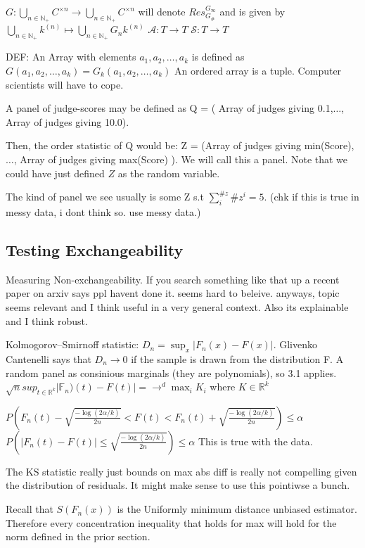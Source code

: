 \documentclass{article}
\begin{document}
$G:\bigcup_{n\in\mathbb{N_+}} C^{\times n}\rightarrow \bigcup_{n\in\mathbb{N_+}} C^{\times n} $ will denote $Res^{G_\infty}_{G_\#}$ and is given by $\bigcup_{n\in \mathbb{N_+}} k^{(n)} \mapsto \bigcup_{n\in \mathbb{N_+}} G_nk^{(n)}$
$\mathcal{A}:T\rightarrow T$
$\mathcal{S}:T\rightarrow T$

DEF: An Array with elements $a_1,a_2,\dots,a_k $ is defined as $G(a_1,a_2,\dots,a_k) = G_k(a_1,a_2,\dots,a_k) $
An ordered array is a tuple. Computer scientists will have to cope.

A panel of judge-scores may be defined as Q = ( Array of judges giving 0.1,$ \dots$, Array of judges giving 10.0).

Then, the order statistic of Q would be: Z = (Array of judges giving min(Score),$\dots$, Array of judges giving max(Score) ). We will call this a panel. Note that we could have just defined $Z$ as the random variable.

The kind of panel we see usually is some Z s.t $\sum_i^{\#z} \#z^i = 5 $.
(chk if this is true in messy data, i dont think so. use messy data.)

\subsection{Testing Exchangeability}
Measuring Non-exchangeability. If you search something like that up a recent paper on arxiv says ppl havent done it. seems hard to beleive. anyways, topic seems relevant and I think useful in a very general context. Also its explainable and I think robust.

\cite{Naaman21}
Kolmogorov–Smirnoff statistic: $D_n = \sup_x |F_n(x) - F(x)| $.
Glivenko Cantenelli says that $D_n \rightarrow 0$ if the sample is drawn from the distribution F.
A random panel as consinious marginals (they are polynomials), so 3.1 applies.
$\sqrt{n} sup_{t\in \mathbb{R}^k}| \mathbb{F}_n)(t) - F(t) | = \rightarrow^d \max_i K_i$ where $K\in \mathbb{R}^k$

$P( F_n(t) - \sqrt{\frac{-\log(2\alpha/ k)}{2n}} < F(t) < F_n(t) + \sqrt{\frac{-\log(2\alpha/k)}{2n}} ) \leq \alpha $ 
$P( |F_n(t) - F(t)|\leq \sqrt{\frac{-\log(2\alpha/ k)}{2n}} ) \leq \alpha $ 
This is true with the data.

The KS statistic really just bounds on max abs diff is really not compelling given the distribution of residuals. It might make sense to use this pointiwse a bunch.

Recall that  $S(F_n(x))$ is the Uniformly minimum distance unbiased estimator. Therefore every concentration inequality that holds for max will hold for the norm defined in the prior section.
\end{document}

